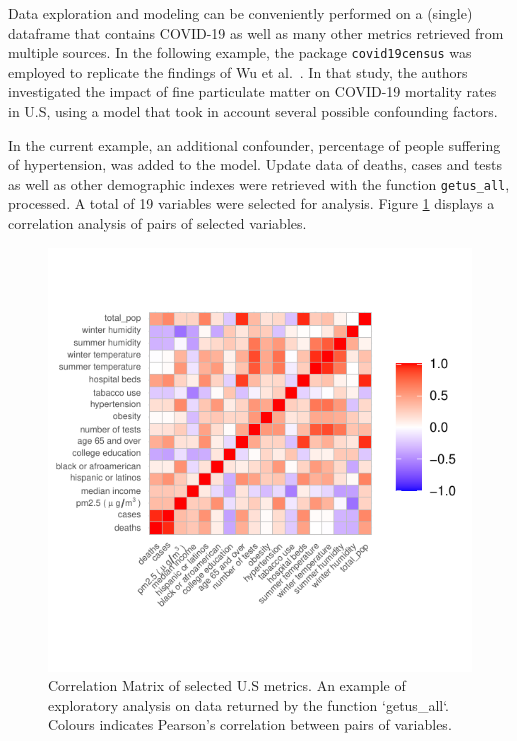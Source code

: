 \documentclass[12pt,halfline,a4paper,]{ouparticle}
\begin{document}
Data exploration and modeling can be conveniently performed on a
(single) dataframe that contains COVID-19 as well as many other metrics
retrieved from multiple sources. In the following example, the package
\texttt{covid19census} was employed to replicate the findings of Wu et
al.~\citeyearpar{wu2020m}. In that study, the authors investigated the
impact of fine particulate matter on COVID-19 mortality rates in U.S,
using a model that took in account several possible confounding factors.

In the current example, an additional confounder, percentage of people
suffering of hypertension, was added to the model. Update data of
deaths, cases and tests as well as other demographic indexes were
retrieved with the function \texttt{getus\_all}, processed. A total of
19 variables were selected for analysis. Figure \ref{fig:fig_corr}
displays a correlation analysis of pairs of selected variables.

\begin{figure}[p]
\includegraphics[width=1\linewidth]{draft_files/figure-latex/fig_corr-1} \caption{Correlation Matrix of selected U.S metrics. An example of exploratory analysis on data returned by the function `getus\_all`. Colours indicates Pearson's correlation between pairs of variables.}\label{fig:fig_corr}
\end{figure}
\end{document}
